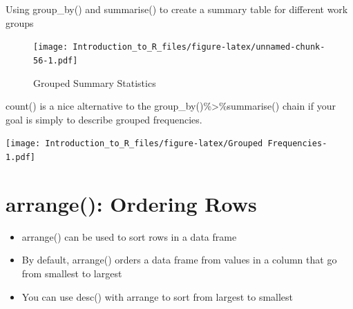 \documentclass[]{book}
\newenvironment{Shaded}{\begin{snugshade}}{\end{snugshade}}
\newcommand{\DataTypeTok}[1]{\textcolor[rgb]{0.13,0.29,0.53}{#1}}
\newcommand{\KeywordTok}[1]{\textcolor[rgb]{0.13,0.29,0.53}{\textbf{#1}}}
\newcommand{\NormalTok}[1]{#1}
\newcommand{\OperatorTok}[1]{\textcolor[rgb]{0.81,0.36,0.00}{\textbf{#1}}}
\newcommand{\OtherTok}[1]{\textcolor[rgb]{0.56,0.35,0.01}{#1}}
\newcommand{\StringTok}[1]{\textcolor[rgb]{0.31,0.60,0.02}{#1}}
\providecommand{\tightlist}{%
  \setlength{\itemsep}{0pt}\setlength{\parskip}{0pt}}
\theoremstyle{definition}
\theoremstyle{definition}
\theoremstyle{definition}
\theoremstyle{remark}
\let\BeginKnitrBlock\begin \let\EndKnitrBlock\end
\begin{document}
\BeginKnitrBlock{example}
\protect\hypertarget{exm:sum2}{}{\label{exm:sum2} }Using group\_by() and summarise() to create a summary table for different work groups
\EndKnitrBlock{example}

\begin{Shaded}
\end{Shaded}

\begin{figure}
\centering
\texttt{[image: Introduction\_to\_R\_files/figure-latex/unnamed-chunk-56-1.pdf]}
\caption{\label{fig:unnamed-chunk-56}Grouped Summary Statistics}
\end{figure}

\BeginKnitrBlock{example}
\protect\hypertarget{exm:count}{}{\label{exm:count} }count() is a nice alternative to the group\_by()\%\textgreater{}\%summarise() chain if your goal is simply to describe grouped frequencies.
\EndKnitrBlock{example}

\begin{Shaded}
\end{Shaded}

\texttt{[image: Introduction\_to\_R\_files/figure-latex/Grouped Frequencies-1.pdf]}

\hypertarget{arrange-ordering-rows}{%
\section{arrange(): Ordering Rows}\label{arrange-ordering-rows}}

\begin{itemize}
\tightlist
\item
  arrange() can be used to sort rows in a data frame
\item
  By default, arrange() orders a data frame from values in a column that go from smallest to largest
\item
  You can use desc() with arrange to sort from largest to smallest
\end{itemize}
\end{document}
